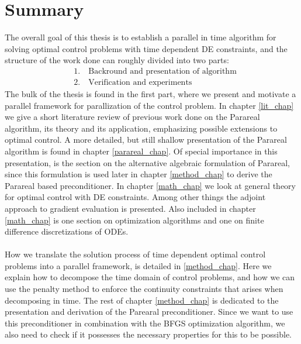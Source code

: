 \section{Summary}
The overall goal of this thesis is to establish a parallel in time algorithm for solving optimal control problems with time dependent DE constraints, and the structure of the work done can roughly divided into two parts:
\begin{align*}
&1.\quad \textrm{Backround and presentation of algorithm} \\
&2.\quad \textrm{Verification and experiments}
\end{align*}
The bulk of the thesis is found in the first part, where we present and motivate a parallel framework for parallization of the control problem. In chapter \ref{lit_chap} we give a short literature review of previous work done on the Parareal algorithm, its theory and its application, emphasizing possible extensions to optimal control. A more detailed, but still shallow presentation of the Parareal algorithm is found in chapter \ref{parareal_chap}. Of special importance in this presentation, is the section on the alternative algebraic formulation of Parareal, since this formulation is used later in chapter \ref{method_chap} to derive the Parareal based preconditioner. In chapter \ref{math_chap} we look at general theory for optimal control with DE constraints. Among other things the adjoint approach to gradient evaluation is presented. Also included in chapter \ref{math_chap} is one section on optimization algorithms and one on finite difference discretizations of ODEs.
\\
\\
How we translate the solution process of time dependent optimal control problems into a parallel framework, is detailed in \ref{method_chap}. Here we explain how to decompose the time domain of control problems, and how we can use the penalty method to enforce the continuity constraints that arises when decomposing in time. The rest of chapter \ref{method_chap} is dedicated to the presentation and derivation of the Parearal preconditioner. Since we want to use this preconditioner in combination with the BFGS optimization algorithm, we also need to check if it possesses the necessary properties for this to be possible. 
\\
\\
